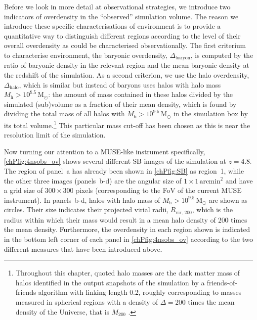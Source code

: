 Before we look in more detail at observational strategies, we introduce two indicators of overdensity in the ``observed'' simulation volume. The reason we introduce these specific characterisations of environment is to provide a quantitative way to distinguish different regions according to the level of their overall overdensity as could be characterised observationally. The first criterium to characterise environment, the baryonic overdensity, $\Delta_\mathrm{baryon}$, is computed by the ratio of baryonic density in the relevant region and the mean baryonic density at the redshift of the simulation. As a second criterion, we use the halo overdensity, $\Delta_\mathrm{halo}$, which is similar but instead of baryons uses halos with halo mass $M_\mathrm{h} > 10^{9.5} \, \mathrm{M_\odot}$: the amount of mass contained in these halos divided by the simulated (sub)volume as a fraction of their mean density, which is found by dividing the total mass of all halos with $M_\mathrm{h} > 10^{9.5} \, \mathrm{M_\odot}$ in the simulation box by its total volume.\footnote{Throughout this chapter, quoted halo masses are the dark matter mass of halos identified in the output snapshots of the simulation by a friends-of-friends algorithm with linking length $0.2$, roughly corresponding to masses measured in spherical regions with a density of $\Delta = 200$ times the mean density of the Universe, that is $M_\mathrm{200}$ \citep[\cref{chIssec:Non-linear_collapse}; see also][]{2008ApJ...688..709T}.} This particular mass cut-off has been chosen as this is near the resolution limit of the simulation.

Now turning our attention to a MUSE-like instrument specifically, \cref{chPfig:4nsobs_ov} shows several different SB images of the simulation at $z=4.8$. The region of panel~a has already been shown in \cref{chPfig:SB} as region~1, while the other three images (panels~b-d) are the angular size of $1 \times 1 \, \mathrm{arcmin}^2$ and have a grid size of $300 \times 300$ pixels (corresponding to the FoV of the current MUSE instrument). In panels~b-d, halos with halo mass of $M_\mathrm{h} > 10^{9.5} \, \mathrm{M_\odot}$ are shown as circles. Their size indicates their projected virial radii, $R_\mathrm{vir, \, 200}$, which is the radius within which their mass would result in a mean halo density of $200$ times the mean density. Furthermore, the overdensity in each region shown is indicated in the bottom left corner of each panel in \cref{chPfig:4nsobs_ov} according to the two different measures that have been introduced above.


